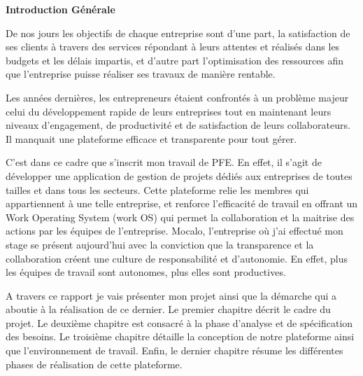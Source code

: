 \thispagestyle{plain}
\begin{center}
	\textbf{\textbf{\fontsize{16pt}{24pt}\selectfont Introduction Générale}}
\end{center}
\vspace{0.3cm}
\fontsize{12pt}{24pt}\selectfont
\hspace{4mm}De nos jours les objectifs de chaque entreprise sont d’une part, la satisfaction de ses clients à travers des services répondant à leurs attentes et réalisés dans les budgets et les délais impartis, et d’autre part l’optimisation des ressources afin que l’entreprise puisse réaliser ses travaux de manière rentable.
  
Les années dernières, les entrepreneurs étaient confrontés à un problème majeur celui du développement rapide de leurs entreprises tout en maintenant leurs niveaux d’engagement, de productivité et de satisfaction de leurs collaborateurs. Il manquait une plateforme efficace et transparente pour tout gérer.

C’est dans ce cadre que s’inscrit mon travail de PFE. En effet, il s’agit de développer une application de gestion de projets dédiés aux entreprises de toutes tailles et dans tous les secteurs. Cette plateforme relie les membres qui appartiennent à une telle entreprise, et renforce l’efficacité de travail en offrant un Work Operating System (work OS) qui permet la collaboration et la maitrise des actions par les équipes de l’entreprise. Mocalo, l'entreprise où j'ai effectué mon stage se présent aujourd’hui avec la conviction que la transparence et la collaboration créent une culture de responsabilité et d’autonomie. En effet, plus les équipes de travail sont autonomes, plus elles sont productives.
\par A travers ce rapport je vais présenter mon projet ainsi que la démarche qui a aboutie à la réalisation de ce dernier. Le premier chapitre décrit le cadre du projet. Le deuxième chapitre est consacré à la phase d’analyse et de spécification des besoins. Le troisième chapitre détaille la conception de notre plateforme ainsi que l’environnement de travail. Enfin, le dernier chapitre résume les différentes phases de réalisation de cette plateforme. 

